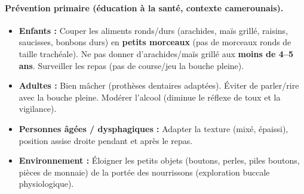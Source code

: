 \documentclass[11pt]{article}
\begin{document}
\paragraph{Prévention primaire (éducation à la santé, contexte camerounais).}
\begin{itemize}
    \item \textbf{Enfants :} Couper les aliments ronds/durs (arachides, maïs grillé, raisins, saucisses, bonbons durs) en \textbf{petits morceaux} (pas de morceaux ronds de taille trachéale). Ne pas donner d'arachides/maïs grillé aux \textbf{moins de 4--5 ans}. Surveiller les repas (pas de course/jeu la bouche pleine).
    \item \textbf{Adultes :} Bien mâcher (prothèses dentaires adaptées). Éviter de parler/rire avec la bouche pleine. Modérer l'alcool (diminue le réflexe de toux et la vigilance).
    \item \textbf{Personnes âgées / dysphagiques :} Adapter la texture (mixé, épaissi), position assise droite pendant et après le repas.
    \item \textbf{Environnement :} Éloigner les petits objets (boutons, perles, piles boutons, pièces de monnaie) de la portée des nourrissons (exploration buccale physiologique).
\end{itemize}
\end{document}
